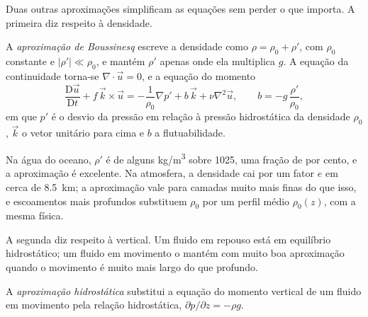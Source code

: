 \begin{omfigure}
\par{}\label{fig:b3:gfd-foundations:frame}
\end{omfigure}

Duas outras aproximações simplificam as equações sem perder o que
importa. A primeira diz respeito à densidade.

\begin{definition}\label{def:b3:gfd-foundations:boussinesq}
A \emph{aproximação de Boussinesq} escreve
a densidade como $\rho = \rho_0 + \rho'$, com $\rho_0$ constante e
$|\rho'| \ll \rho_0$, e mantém $\rho'$ apenas onde ela multiplica $g$.
A equação da continuidade torna-se $\nabla\cdot\vec u = 0$, e a equação
do momento
\[
\frac{\mathrm D\vec u}{\mathrm Dt} + f\,\vec k\times\vec u =
-\frac{1}{\rho_0}\nabla p' + b\,\vec k + \nu\nabla^2\vec u ,
\qquad b = -g\,\frac{\rho'}{\rho_0} ,
\]
em que $p'$ é o desvio da pressão em relação à pressão hidrostática
da densidade $\rho_0$, $\vec k$ o vetor unitário para cima e $b$ a
flutuabilidade.
\end{definition}

Na água do oceano, $\rho'$ é de alguns \unit{kg/m^3} sobre \num{1025}, uma fração de
por cento, e a aproximação é excelente. Na atmosfera, a densidade cai por um
fator $e$ em cerca de \qty{8.5}{km}; a aproximação vale para camadas muito
mais finas do que isso, e escoamentos mais profundos substituem $\rho_0$ por um
perfil médio $\rho_0(z)$, com a mesma física.

A segunda diz respeito à vertical. Um fluido em repouso está em equilíbrio
hidrostático; um fluido em movimento o mantém com muito boa aproximação quando
o movimento é muito mais largo do que profundo.

\begin{definition}\label{def:b3:gfd-foundations:hydrostatic}
A \emph{aproximação hidrostática}
substitui a equação do momento vertical de um fluido em movimento pela
relação hidrostática, $\partial p/\partial z = -\rho g$.
\end{definition}

